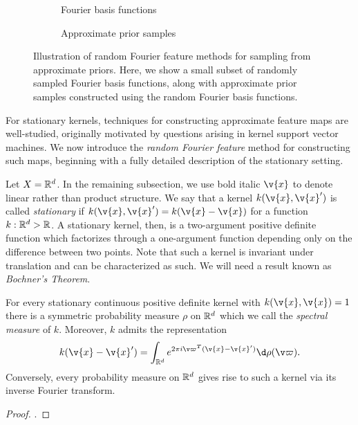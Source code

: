 \documentclass[11pt]{book}
\begin{document}
\begin{figure}
\begin{subfigure}{0.49\textwidth}

\caption{Fourier basis functions}
\end{subfigure}
\begin{subfigure}{0.49\textwidth}

\caption{Approximate prior samples}
\end{subfigure}
\caption[Random Fourier feature prior approximations]{Illustration of random Fourier feature methods for sampling from approximate priors. Here, we show a small subset of randomly sampled Fourier basis functions, along with approximate prior samples constructed using the random Fourier basis functions.}
\label{fig:gp-rff}
\end{figure}

For stationary kernels, techniques for constructing approximate feature maps are well-studied, originally motivated by questions arising in kernel support vector machines.
We now introduce the \emph{random Fourier feature} method for constructing such maps, beginning with a fully detailed description of the stationary setting.

Let $X = \mathbb{R}^d$.
In the remaining subsection, we use bold italic $\v{x}$ to denote linear rather than product structure.
We say that a kernel $k(\v{x},\v{x}')$ is called \emph{stationary} if $k(\v{x},\v{x}') = k(\v{x} - \v{x})$ for a function $k : \mathbb{R}^d \-> \mathbb{R}$.
A stationary kernel, then, is a two-argument positive definite function which factorizes through a one-argument function depending only on the difference between two points.
Note that such a kernel is invariant under translation and can be characterized as such.
We will need a result known as \emph{Bochner's Theorem}.

\begin{result}
For every stationary continuous positive definite kernel with $k(\v{x},\v{x}) = 1$ there is a symmetric probability measure $\rho$ on $\mathbb{R}^d$ which we call the \emph{spectral measure} of $k$.
Moreover, $k$ admits the representation
\[
k(\v{x} - \v{x}') = \int_{\R^d} e^{2\pi i \v\varpi^T (\v{x} - \v{x}')} \d\rho(\v\varpi)
.
\]
Conversely, every probability measure on $\mathbb{R}^d$ gives rise to such a kernel via its inverse Fourier transform.
\end{result}

\begin{proof}
\textcite[Theorem 10.4]{paulsen16}.
\end{proof}
\end{document}
